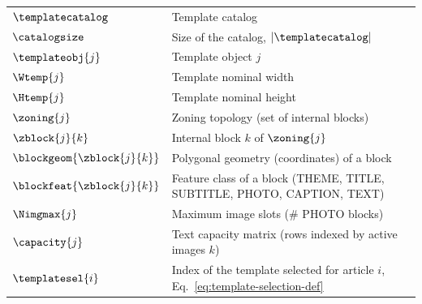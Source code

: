 \begin{tabularx}{\textwidth}{@{}l X@{}}
$\templatecatalog$      & Template catalog \\
$\catalogsize$          & Size of the catalog, $|\templatecatalog|$ \\
$\templateobj{j}$       & Template object $j$ \\
$\Wtemp{j}$             & Template nominal width \\
$\Htemp{j}$             & Template nominal height \\
$\zoning{j}$            & Zoning topology (set of internal blocks) \\
$\zblock{j}{k}$         & Internal block $k$ of $\zoning{j}$ \\
$\blockgeom{\zblock{j}{k}}$ & Polygonal geometry (coordinates) of a block \\
$\blockfeat{\zblock{j}{k}}$ & Feature class of a block (THEME, TITLE, SUBTITLE, PHOTO, CAPTION, TEXT) \\
$\Nimgmax{j}$           & Maximum image slots (\# PHOTO blocks) \\
$\capacity{j}$          & Text capacity matrix (rows indexed by active images $k$) \\

\midrule
$\templatesel{i}$ & Index of the template selected for article $i$, Eq.~\eqref{eq:template-selection-def} \\

\bottomrule
\end{tabularx}
